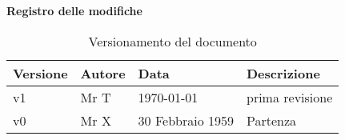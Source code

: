 \Large{\textbf{Registro delle modifiche}}\\
\normalsize

\begin{table}[h]
\begin{center}

\begin{tabular}{p{} p{} p{} p{}}
\toprule
\textbf{Versione}	&	\textbf{Autore}	&	\textbf{Data}	&	\textbf{Descrizione}\\
\midrule
\midrule
v1	&	Mr T	&	\today 	&	prima revisione\\
\midrule
v0	&	Mr X	&	30 Febbraio 1959	&	Partenza\\
\bottomrule
\end{tabular}
\caption{Versionamento del documento}
\label{tabVers1}
\end{center}
\end{table}